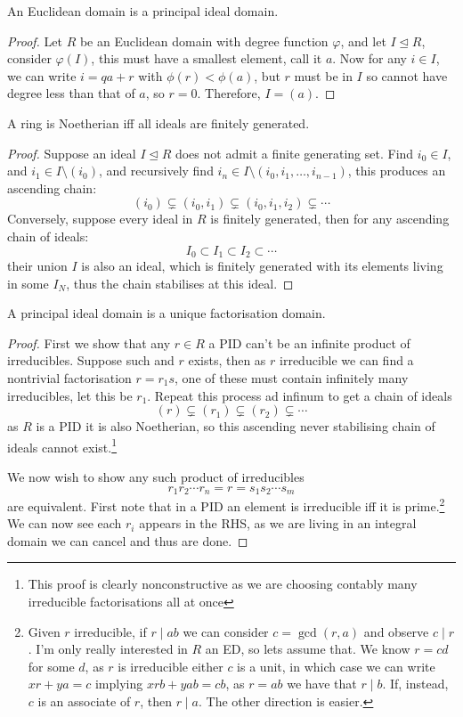 \documentclass{article}
\begin{document}
\begin{proposition}
    An Euclidean domain is a principal ideal domain.
    \begin{proof}
        Let $R$ be an Euclidean domain with degree function $\varphi$, and let $I\unlhd R$, consider $\varphi(I)$, this must have a smallest element, call it $a$. Now for any $i\in I$, we can write $i = qa + r$ with $\phi(r)<\phi(a)$, but $r$ must be in $I$ so cannot have degree less than that of $a$, so $r=0$. Therefore, $I=(a)$.
    \end{proof}
\end{proposition}

\begin{proposition}
    A ring is Noetherian iff all ideals are finitely generated.\begin{proof}
        Suppose an ideal $I\unlhd R$ does not admit a finite generating set. Find $i_0\in I$, and $i_1\in I\setminus(i_0)$, and recursively find $i_n\in I\setminus(i_0,i_1,\ldots,i_{n-1})$, this produces an ascending chain: \[
        (i_0) \subsetneq (i_0,i_1) \subsetneq (i_0,i_1,i_2) \subsetneq \cdots
        \] Conversely, suppose every ideal in $R$ is finitely generated, then for any ascending chain of ideals: \[
        I_0 \subset I_1 \subset I_2 \subset \cdots
        \] their union $I$ is also an ideal, which is finitely generated with its elements living in some $I_N$, thus the chain stabilises at this ideal.
    \end{proof}
\end{proposition}

\begin{proposition}
    A principal ideal domain is a unique factorisation domain.
    \begin{proof}
        First we show that any $r\in R$ a PID can't be an infinite product of irreducibles. Suppose such and $r$ exists, then as $r$ irreducible we can find a nontrivial factorisation $r=r_1s$, one of these must contain infinitely many irreducibles, let this be $r_1$. Repeat this process ad infinum to get a chain of ideals \[
        (r)\subsetneq (r_1) \subsetneq (r_2) \subsetneq \cdots
        \] as $R$ is a PID it is also Noetherian, so this ascending never stabilising chain of ideals cannot exist.\footnote{This proof is clearly nonconstructive as we are choosing contably many irreducible factorisations all at once}

        We now wish to show any such product of irreducibles \[
        r_1r_2\cdots r_n = r = s_1s_2\cdots s_m
        \] are equivalent. First note that in a PID an element is irreducible iff it is prime.\footnote{Given $r$ irreducible, if $r\mid ab$ we can consider $c=\gcd(r,a)$ and observe $c\mid r$. I'm only really interested in $R$ an ED, so lets assume that. We know $r=cd$ for some $d$, as $r$ is irreducible either $c$ is a unit, in which case we can write $xr+ya=c$ implying $xrb+yab=cb$, as $r=ab$ we have that $r\mid b$. If, instead, $c$ is an associate of $r$, then $r\mid a$. The other direction is easier.} We can now see each $r_i$ appears in the RHS, as we are living in an integral domain we can cancel and thus are done.
    \end{proof}
\end{proposition}
\end{document}
